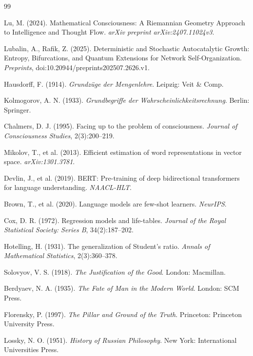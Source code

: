 \documentclass[11pt,a4paper]{article}
\theoremstyle{definition}
\theoremstyle{remark}
\begin{document}

\begin{thebibliography}{99}

Lu, M. (2024). Mathematical Consciousness: A Riemannian Geometry Approach to Intelligence and Thought Flow. \textit{arXiv preprint arXiv:2407.11024v3}.

Lubalin, A., Rafik, Z. (2025). Deterministic and Stochastic Autocatalytic Growth: Entropy, Bifurcations, and Quantum Extensions for Network Self-Organization. \textit{Preprints}, doi:10.20944/preprints202507.2626.v1.

Hausdorff, F. (1914). \textit{Grundzüge der Mengenlehre}. Leipzig: Veit \& Comp.

Kolmogorov, A. N. (1933). \textit{Grundbegriffe der Wahrscheinlichkeitsrechnung}. Berlin: Springer.

Chalmers, D. J. (1995). Facing up to the problem of consciousness. \textit{Journal of Consciousness Studies}, 2(3):200–219.

Mikolov, T., et al. (2013). Efficient estimation of word representations in vector space. \textit{arXiv:1301.3781}.

Devlin, J., et al. (2019). BERT: Pre-training of deep bidirectional transformers for language understanding. \textit{NAACL-HLT}.

Brown, T., et al. (2020). Language models are few-shot learners. \textit{NeurIPS}.

Cox, D. R. (1972). Regression models and life-tables. \textit{Journal of the Royal Statistical Society: Series B}, 34(2):187–202.

Hotelling, H. (1931). The generalization of Student's ratio. \textit{Annals of Mathematical Statistics}, 2(3):360–378.

Solovyov, V. S. (1918). \textit{The Justification of the Good}. London: Macmillan.

Berdyaev, N. A. (1935). \textit{The Fate of Man in the Modern World}. London: SCM Press.

Florensky, P. (1997). \textit{The Pillar and Ground of the Truth}. Princeton: Princeton University Press.

Lossky, N. O. (1951). \textit{History of Russian Philosophy}. New York: International Universities Press.


\end{thebibliography}
\end{document}
